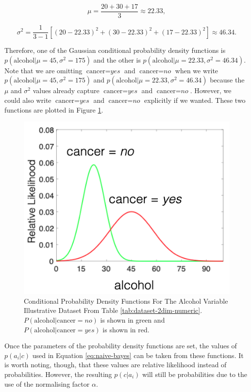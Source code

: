 \[ \mu = \frac{20 + 30 + 17}{3} \approx 22.33,\]

\[ \sigma^2 = \frac{1}{3-1} [(20 - 22.33)^2+(30 - 22.33)^2+(17 - 22.33)^2] \approx 46.34.\]

Therefore, one of the Gaussian conditional probability density functions is $p(\text{alcohol}|\mu=45,\sigma^2=175)$ and the other is $p(\text{alcohol}|\mu=22.33,\sigma^2=46.34)$. Note that we are omitting $\text{cancer}=\textit{yes}$ and $\text{cancer}=\textit{no}$ when we write $p(\text{alcohol}|\mu=45,\sigma^2=175)$ and $p(\text{alcohol}|\mu=22.33,\sigma^2=46.34)$ because the $\mu$ and $\sigma^2$ values already capture $\text{cancer}=\textit{yes}$ and $\text{cancer}=\textit{no}$. However, we could also write $\text{cancer}=\textit{yes}$ and $\text{cancer}=\textit{no}$ explicitly if we wanted. These two functions are plotted in Figure \ref{fig:nb-gaussian-pdfs}.

\begin{figure}[h]
\centering
\includegraphics[scale=0.3]{"figures/nb-gaussian-pdfs.png"} %
\caption{Conditional Probability Density Functions For The Alcohol Variable Illustrative Dataset From Table \ref{tab:dataset-2dim-numeric}. $P(\text{alcohol}|\text{cancer}=\textit{no})$ is shown in green and $P(\text{alcohol}|\text{cancer}=\textit{yes})$ is shown in red.} \label{fig:nb-gaussian-pdfs}
\end{figure}


Once the parameters of the probability density functions are set, the values of $p(a_i|c)$ used in Equation \ref{eq:naive-bayes} can be taken from these functions. It is worth noting, though, that these values are relative likelihood instead of probabilities. However, the resulting $p(c|a_i)$ will still be probabilities due to the use of the normalising factor $\alpha$.

